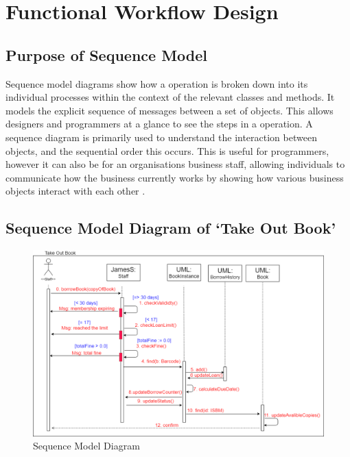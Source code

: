 \section{Functional Workflow Design}
\subsection{Purpose of Sequence Model}
Sequence model diagrams show how a operation is broken down into its individual processes within the context of the relevant classes and methods. It models the explicit sequence of messages between a set of objects\cite{microsoftseq}. This allows designers and programmers at a glance to see the steps in a operation. A sequence diagram is primarily used to understand the interaction between objects, and the sequential order this occurs\cite{feliciseq}. This is useful for programmers, however it can also be for an organisations business staff, allowing individuals to communicate how the business currently works by showing how various business objects interact with each other\cite{seqbell} .

\subsection{Sequence Model Diagram of `Take Out Book'}

\begin{figure}[H]
    \centering
    \includegraphics[width=0.9\linewidth]{image/sequence.png}
    \caption{Sequence Model Diagram}
    \label{fig:sequence}
\end{figure}

